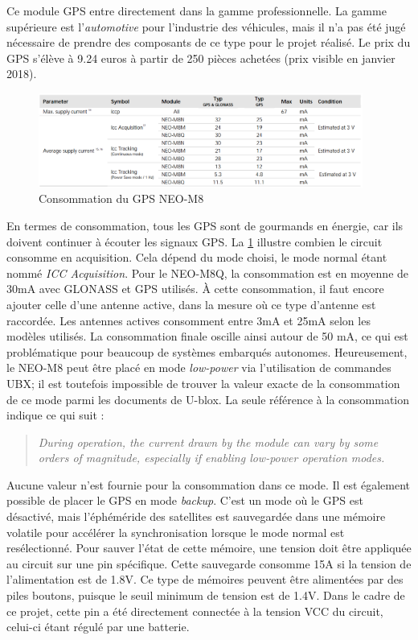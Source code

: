 Ce module GPS entre directement dans la gamme professionnelle. La gamme supérieure est l'\textit{automotive} pour l'industrie des véhicules, mais il n'a pas été jugé nécessaire de prendre des composants de ce type pour le projet réalisé.
Le prix du GPS s'élève à 9.24 euros à partir de 250 pièces achetées (prix visible en janvier 2018).

\begin{figure}[ht!]
    \centering
    \includegraphics[width=0.95\textwidth]{Figures/Hardware/gps_neo_current_consumption.PNG}
    \caption{Consommation du GPS NEO-M8}
    \label{fig-gps_neo_current_consumption}
\end{figure}

En termes de consommation, tous les GPS sont de gourmands en énergie, car ils doivent continuer à écouter les signaux GPS. La \cref{fig-gps_neo_current_consumption} illustre combien le circuit consomme en acquisition. Cela dépend du mode choisi, le mode normal étant nommé \textit{ICC Acquisition}. Pour le NEO-M8Q, la consommation est en moyenne de 30mA avec GLONASS et GPS utilisés. À cette consommation, il faut encore ajouter celle d'une antenne active, dans la mesure où ce type d'antenne est raccordée. Les antennes actives consomment entre 3mA et 25mA selon les modèles utilisés. La consommation finale oscille ainsi autour de 50 mA, ce qui est problématique pour beaucoup de systèmes embarqués autonomes. Heureusement, le NEO-M8 peut être placé en mode \textit{low-power} via l'utilisation de commandes UBX; il est toutefois impossible de trouver la valeur exacte de la consommation de ce mode parmi les documents de U-blox. La seule référence à la consommation indique ce qui suit : 

\begin{quote}
\begin{center}
    \textit{During operation, the current drawn by the module can vary by some orders of magnitude, especially if enabling low-power operation modes.}
\end{center}
\end{quote}

Aucune valeur n'est fournie pour la consommation dans ce mode. Il est également possible de placer le GPS en mode \textit{backup}. C'est un mode où le GPS est désactivé, mais l'éphéméride des satellites est sauvegardée dans une mémoire volatile pour accélérer la synchronisation lorsque le mode normal est resélectionné. Pour sauver l'état de cette mémoire, une tension doit être appliquée au circuit sur une pin spécifique. Cette sauvegarde consomme 15\si{\micro{}}A si la tension de l'alimentation est de 1.8V. Ce type de mémoires peuvent être alimentées par des piles boutons, puisque le seuil minimum de tension est de 1.4V. Dans le cadre de ce projet, cette pin a été directement connectée à la tension VCC du circuit, celui-ci étant régulé par une batterie.



